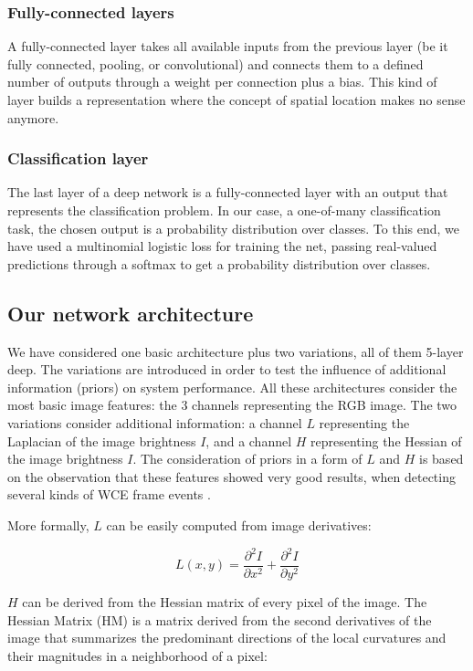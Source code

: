 \documentclass[review,12pt,3p]{elsarticle}
\begin{document}
\subsubsection{Fully-connected layers}
A fully-connected layer takes all available inputs from the previous layer (be it fully connected, pooling, or convolutional) and connects them to a defined number of outputs through a weight per connection plus a bias. This kind of layer builds a representation where the concept of spatial location makes no sense anymore.

\subsubsection{Classification layer}
The last layer of a deep network is a fully-connected layer with an output that represents the classification problem. In our case, a one-of-many classification task, the chosen output is a probability distribution over classes. To this end, we have used a multinomial logistic loss for training the net, passing real-valued predictions through a softmax to get a probability distribution over classes.


\subsection{Our network architecture}
\label{subsec1}

We have considered one basic architecture plus two variations, all of them 5-layer deep. The variations are introduced in order to test the influence of additional information (priors) on system performance. All these architectures consider the most basic image  features: the 3 channels representing the RGB image. The two variations consider additional information: a channel $L$ representing the Laplacian of the image brightness $I$, and a channel $H$ representing the Hessian of the image brightness $I$. The consideration of priors in a form of $L$ and $H$ is based on the observation that these features showed very good results, when detecting several kinds of WCE frame events \cite{sseguiWrinkles, sseguiTurbid}.

More formally, $L$ can be easily computed from image derivatives:

$$ L(x,y) = \frac{\partial^2 I}{\partial x^2} +\frac{\partial^2 I}{\partial y^2} $$

$H$ can be derived from the Hessian matrix of every pixel of the image. The Hessian Matrix (HM) is a matrix derived from the second derivatives of the image that summarizes the predominant directions of the local curvatures and their magnitudes in a neighborhood of a pixel:
\end{document}
